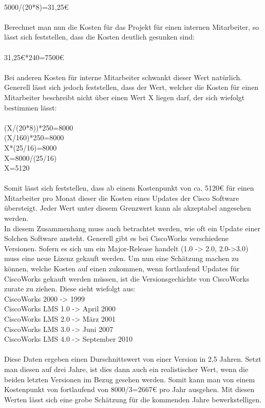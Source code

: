 \\
5000/(20*8)=31,25€\\
\\
Berechnet man nun die Kosten für das Projekt für einen internen Mitarbeiter, so lässt sich feststellen, dass die Kosten deutlich gesunken sind:\\
\\
31,25€*240=7500€\\
\\
Bei anderen Kosten für interne Mitarbeiter schwankt dieser Wert natürlich. Generell lässt sich jedoch feststellen, dass der Wert, welcher die Kosten für einen Mitarbeiter beschreibt nicht über einen Wert X liegen darf, der sich wiefolgt bestimmen lässt:\\
\\
(X/(20*8))*250=8000\\
(X/160)*250=8000\\
X*(25/16)=8000\\
X=8000/(25/16)\\
X=5120\\
\\
Somit lässt sich feststellen, dass ab einem Kostenpunkt von ca. 5120€ für einen Mitarbeiter pro Monat dieser die Kosten eines Updates der Cisco Software übersteigt. Jeder Wert unter diesem Grenzwert kann als akzeptabel angesehen werden.\\
In diesem Zusammenhang muss auch betrachtet werden, wie oft ein Update einer Solchen Software ansteht. Generell gibt es bei CiscoWorks verschiedene Versionen. Sofern es sich um ein Major-Release handelt (1.0 -> 2.0, 2.0->3.0) muss eine neue Lizenz gekauft werden. Um nun eine Schätzung machen zu können, welche Kosten auf einen zukommen, wenn fortlaufend Updates für CiscoWorks gekauft werden müssen, ist die Versionsgechichte von CiscoWorks zurate zu ziehen. Diese sieht wiefolgt aus:
\\
CiscoWorks 2000 -> 1999\\
CiscoWorks LMS 1.0 -> April 2000\\
CiscoWorks LMS 2.0 -> März 2001 \\
CiscoWorks LMS 3.0 -> Juni 2007\\
CiscoWorks LMS 4.0 -> September 2010\\
\\
Diese Daten ergeben einen Durschnittswert von einer Version in 2,5 Jahren. Setzt man diesen auf drei Jahre, ist dies dann auch ein realistischer Wert, wenn die beiden letzten Versionen im Bezug gesehen werden. Somit kann man von einem Kostenpunkt von fortlaufend von 8000/3=2667€ pro Jahr ausgehen. Mit diesen Werten lässt sich eine grobe Schätzung für die kommenden Jahre bewerkstelligen.

